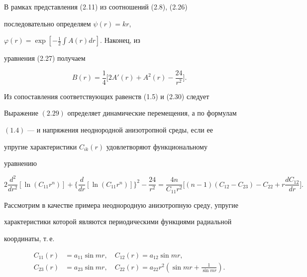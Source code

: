 \begin{case}
 


В рамках представления (2.11) из соотношений (2.8), (2.26) 


последовательно определяем $\psi(r)=kr$, 


$\varphi(r)=\exp\left[-\frac{1}{2}\int A(r)dr\right]$. Наконец, из 


уравнения (2.27) получаем 


\begin{equation} 


B(r)=\frac{1}{4}\biggl[2A'(r)+A^2(r)-\frac{24}{r^2}\biggr]. 


\end{equation} 


\end{case} 


 


Из сопоставления соответствующих равенств (1.5) и (2.30) следует 


 


\begin{thm} 


Выражение $(2.29)$ определяет динамические перемещения, а по формулам 


$(1.4)$ --- и напряжения неоднородной анизотропной среды, если ее 


упругие характеристики $C_{ik}(r)$ удовлетворяют функциональному 


уравнению 


\begin{equation} 


2\frac{d^2}{dr^2}[\ln(C_{11}r^n)]+\biggl\{\frac{d}{dr} 


[\ln(C_{11}r^n)]\biggr\}^2-\frac{24}{r^2}= 


\frac{4n}{C_{11}r^2}\biggl[(n-1)(C_{12}-C_{23})-C_{22}+r 


\frac{d C_{12}}{dr}\biggr]. 


\end{equation} 


\end{thm} 


 


Рассмотрим в качестве примера неоднородную анизотропную среду, упругие 


характеристики которой являются периодическими функциями радиальной 


координаты, т.\,е. 


\begin{equation} 


\begin{split} 


C_{11}(r)&=a_{11}\sin mr,\quad C_{12}(r)=a_{12}\sin mr, \\ 


C_{23}(r)&=a_{23}\sin mr,\quad C_{22}(r)=a_{22}r^2 


(\sin mr+\tfrac{1}{\sin mr}). 


\end{split} 


\end{equation} 


